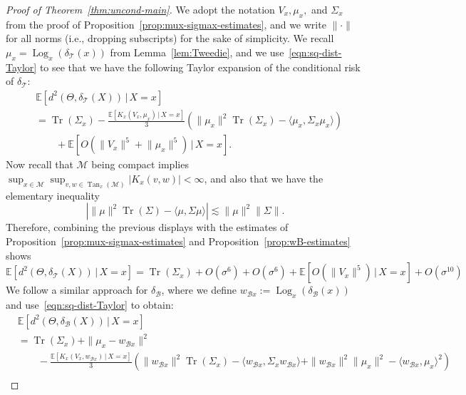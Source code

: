 \documentclass[preprint]{imsart}
\theoremstyle{plain}
\theoremstyle{definition}
\newcommand{\Ebb}{\mathbb{E}}
\newcommand{\Mcal}{\mathcal{M}}
\newcommand{\trace}{\operatorname{Tr}}
\DeclareMathOperator{\Tan}{Tan}
\newcommand{\B}{\mathcal{B}}
\newcommand{\T}{\mathcal{T}}
\DeclareMathOperator{\Log}{Log}
\begin{document}
\begin{appendix}
\begin{proof}[Proof of Theorem~\ref{thm:uncond-main}]
We adopt the notation $V_x,\mu_x,$ and $\Sigma_x$ from the proof of Proposition~\ref{prop:mux-sigmax-estimates}, and we write $\|\cdot\|$ for all norms (i.e., dropping subscripts) for the sake of simplicity.
We recall
 $\mu_x = \Log_x(\delta_{\T}(x))$ from Lemma~\ref{lem:Tweedie}, and we use~\eqref{eqn:sq-dist-Taylor} to see that we have the following Taylor expansion of the conditional risk of $\delta_{\T}$:
\begin{equation*}
    \begin{split}
        &\Ebb[d^2(\Theta,\delta_{\T}(X))\,|\,X=x] \\
        &= \trace(\Sigma_x) - \frac{\Ebb[K_x(V_x,\mu_x)\,|\,X=x]}{3}\left(\| \mu_x\|^2\trace(\Sigma_x)  - \langle \mu_x,\Sigma_x \mu_x\rangle\right) \\
        &\qquad+ \Ebb\left[O\!\left(\lVert V_x\rVert^5+\lVert  \mu_x\rVert^5\right)\,|\,X=x\right].
    \end{split}
    \end{equation*}
    Now recall that $\Mcal$ being compact implies $\sup_{x\in\Mcal}\sup_{v,w\in\Tan_x(\Mcal)}|K_x(v,w)|<\infty$, and also that we have the elementary inequality
    \begin{equation*}
        \left|\|\mu\|^2\trace(\Sigma)-\langle\mu,\Sigma\mu\rangle\right| \lesssim \|\mu\|^2\|\Sigma\|.
    \end{equation*}
    Therefore, combining the previous displays with the estimates of Proposition~\ref{prop:mux-sigmax-estimates} and Proposition~\ref{prop:wB-estimates} shows
    \begin{equation}\label{eqn:conditional-risk-T}
        \Ebb[d^2(\Theta,\delta_{\T}(X))\,|\,X=x] = \trace(\Sigma_x) + O(\sigma^6) + O(\sigma^{6}) + \Ebb\left[O\!\left(\lVert V_x\rVert^5\right)\,|\,X=x\right] + O(\sigma^{10})        
    \end{equation}
    We follow a similar approach for $\delta_{\B}$, where we define $w_{\B x}:=\Log_x(\delta_{\B}(x))$ and use~\eqref{eqn:sq-dist-Taylor} to obtain:
    \begin{equation*}
        \begin{split}
            &\Ebb[d^2(\Theta,\delta_{\B}(X))\,|\,X=x] \\
            &= \trace(\Sigma_x) + \|\mu_x- w_{\B x}\|^2 \\
            &\qquad-\frac{\Ebb[K_x(V_x,w_{\B x})\,|\,X=x]}{3}\left(\| w_{\B x}\|^2\trace(\Sigma_x)  - \langle w_{\B x},\Sigma_x w_{\B x}\rangle + \|w_{\B x}\|^2\|\mu_x\|^2 - \langle w_{\B x},\mu_x\rangle^2\right) \\

\end{split}
\end{equation*}
\end{proof}
\end{appendix}
\end{document}
